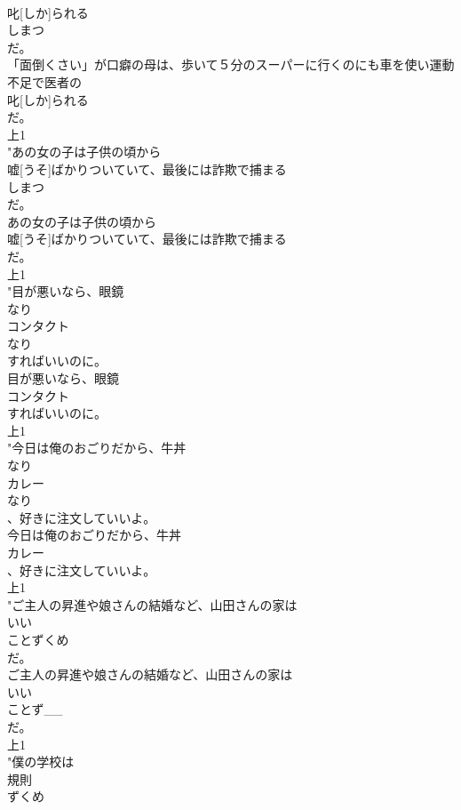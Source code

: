 \documentclass[8pt]{extreport}
\begin{document}
\begin{CJK}{UTF8}{min}
\\	叱[しか]られる
\\	しまつ
\\	だ。
\\	「面倒くさい」が口癖の母は、歩いて５分のスーパーに行くのにも車を使い運動不足で医者の
\\	叱[しか]られる
\\	だ。
\\	上1
\\	"あの女の子は子供の頃から
\\	嘘[うそ]ばかりついていて、最後には詐欺で捕まる
\\	しまつ
\\	だ。
\\	あの女の子は子供の頃から
\\	嘘[うそ]ばかりついていて、最後には詐欺で捕まる
\\	だ。
\\	上1
\\	"目が悪いなら、眼鏡
\\	なり
\\	コンタクト
\\	なり
\\	すればいいのに。
\\	目が悪いなら、眼鏡
\\	コンタクト
\\	すればいいのに。
\\	上1
\\	"今日は俺のおごりだから、牛丼
\\	なり
\\	カレー
\\	なり
\\	、好きに注文していいよ。
\\	今日は俺のおごりだから、牛丼
\\	カレー
\\	、好きに注文していいよ。
\\	上1
\\	"ご主人の昇進や娘さんの結婚など、山田さんの家は
\\	いい
\\	ことずくめ
\\	だ。
\\	ご主人の昇進や娘さんの結婚など、山田さんの家は
\\	いい
\\	ことず__
\\	だ。
\\	上1
\\	"僕の学校は
\\	規則
\\	ずくめ

\end{CJK}
\end{document}
